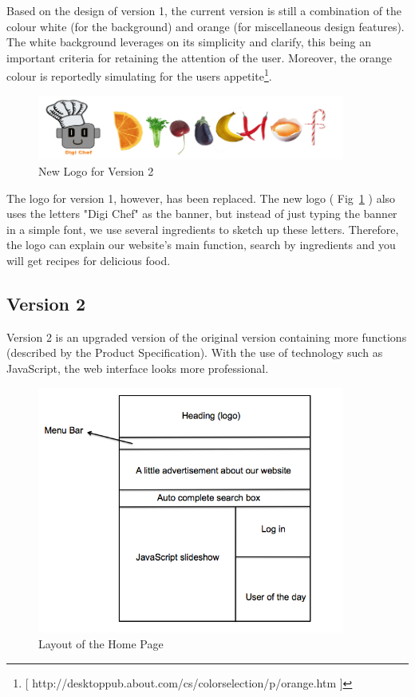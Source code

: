 Based on the design of version 1, the current version is still a combination of the colour white (for the background) and orange (for miscellaneous design features). The white background leverages on its simplicity and clarify, this being an important criteria for retaining the attention of the user. Moreover, the orange colour is reportedly simulating for the users appetite\footnote{[ http://desktoppub.about.com/cs/colorselection/p/orange.htm ]}. 

\begin{figure}[h]
\begin{center}
\includegraphics[width=0.9\textwidth]{logowebsite}
\caption{New Logo for Version 2}
\label{fig:logowebsite}
\end{center}
\end{figure}

The logo for version 1, however, has been replaced. The new logo ( Fig~\ref{fig:logowebsite} ) also uses the letters "Digi Chef" as the banner, but instead of just typing the banner in a simple font, we use several ingredients to sketch up these letters. Therefore, the logo can explain our website's main function, search by ingredients and you will get  recipes for delicious food. 

\subsection{Version 2}

Version 2 is an upgraded version of the original version containing more functions (described by the Product Specification). With the use of technology such as JavaScript, the web interface looks more professional. 

\begin{figure}[h]
\begin{center}
\includegraphics[width=0.9\textwidth]{home_page_v2}
\caption{Layout of the Home Page}
\label{fig:home_page}
\end{center}
\end{figure}

